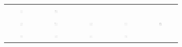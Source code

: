 \begin{figure}
\begin{subfigure}{\textwidth}
\begin{tabular}{c@{\,}c@{\,}c@{\,}c@{\,}c@{}}
				\includegraphics[width=0.1\textwidth]{fig01c04} &
				\includegraphics[width=0.1\textwidth]{fig01c05} \\
				\includegraphics[width=0.1\textwidth]{fig01c06} &
				\includegraphics[width=0.1\textwidth]{fig01c07} &
				\includegraphics[width=0.1\textwidth]{fig01c08} &
				\includegraphics[width=0.1\textwidth]{fig01c09} &
				\includegraphics[width=0.1\textwidth]{fig01c10} \\
				\includegraphics[width=0.1\textwidth]{fig01c11} &
				\includegraphics[width=0.1\textwidth]{fig01c12} &
				\includegraphics[width=0.1\textwidth]{fig01c13} &
				\includegraphics[width=0.1\textwidth]{fig01c14} &

\end{tabular}
\end{subfigure}
\end{figure}
